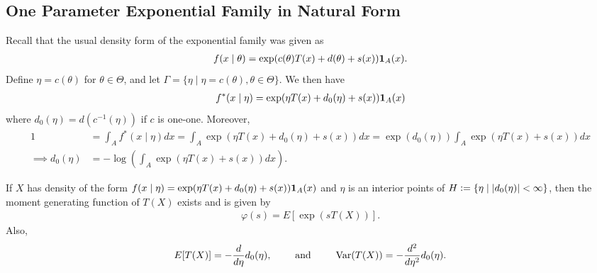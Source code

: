 \subsection{One Parameter Exponential Family in Natural Form}
Recall that the usual density form of the exponential family was given as
\begin{align}
    f(x \mid \theta) = \exp(c(\theta)T(x) + d(\theta) + s(x))\textbf{1}_{A}(x).
\end{align}
Define $\eta = c(\theta)$ for $\theta \in \Theta$, and let $\Gamma = \{\eta \mid \eta = c(\theta), \theta \in \Theta\}$. We then have
\begin{align}
    f^{\ast}(x \mid \eta) = \exp(\eta T(x) + d_{0}(\eta) + s(x))\textbf{1}_{A}(x)
\end{align}
where $d_{0}(\eta) = d(c^{-1}(\eta))$ if $c$ is one-one. Moreover,
\begin{align}
    1 &= \int_{A}f^{\ast}(x \mid \eta)dx = \int_{A} \exp(\eta T(x) + d_{0}(\eta) + s(x))dx = \exp(d_{0}(\eta)) \int_{A} \exp(\eta T(x)+s(x))dx \\
    \implies d_{0}(\eta) &= -\log\left( \int_{A} \exp(\eta T(x) + s(x))dx\right). 
\end{align}

\begin{theorem}
    If $X$ has density of the form $f(x \mid \eta) = \exp(\eta T(x) + d_{0}(\eta) + s(x))\textbf{1}_{A}(x)$ and $\eta$ is an interior points of $H \vcentcolon= \{\eta \mid \left| d_{0}(\eta) \right| < \infty\}$, then the moment generating function of $T(X)$ exists and is given by
    \begin{align}
        \varphi(s) = E[\exp(sT(X))].
    \end{align}
    Also,
    \begin{align}
        E[T(X)] = -\frac{d}{d\eta} d_{0}(\eta), \qquad \text{ and } \qquad \operatorname{Var}(T(X)) = -\frac{d^{2}}{d\eta^{2}} d_{0}(\eta).
    \end{align}
\end{theorem}

